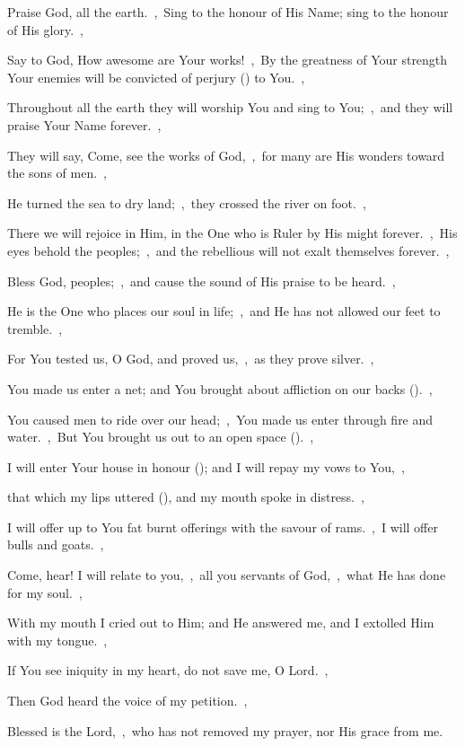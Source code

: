 \documentclass[12pt,twoside,a5paper]{article}
\begin{document}

\begin{normalparskip}
  Praise God, all the earth.~\sep\ Sing to the honour of His Name; sing to the honour of His glory.~\sep


  Say to God, How awesome are Your works!~\sep\ By the greatness of Your strength Your enemies will be convicted of perjury () to You.~\sep

  Throughout all the earth they will worship You and sing to You;~\sep\ and they will praise Your Name forever.~\sep

  They will say, Come, see the works of God,~\sep\ for many are His wonders toward the sons of men.~\sep

  He turned the sea to dry land;~\sep\ they crossed the river on foot.~\sep

  There we will rejoice in Him, in the One who is Ruler by His might forever.~\sep\ His eyes behold the peoples;~\sep\ and the rebellious will not exalt themselves forever.~\sep

  Bless God, peoples;~\sep\ and cause the sound of His praise to be heard.~\sep

  He is the One who places our soul in life;~\sep\ and He has not allowed our feet to tremble.~\sep

  For You tested us, O God, and proved us,~\sep\ as they prove silver.~\sep

  You made us enter a net; and You brought about affliction on our backs ().~\sep

  You caused men to ride over our head;~\sep\ You made us enter through fire and water.~\sep\ But You brought us out to an open space ().~\sep

  I will enter Your house in honour (); and I will repay my vows to You,~\sep

  that which my lips uttered (), and my mouth spoke in distress.~\sep

  I will offer up to You fat burnt offerings with the savour of rams.~\sep\ I will offer bulls and goats.~\sep

  Come, hear! I will relate to you,~\sep\ all you servants of God,~\sep\ what He has done for my soul.~\sep

  With my mouth I cried out to Him; and He answered me, and I extolled Him with my tongue.~\sep

  If You see iniquity in my heart, do not save me, O Lord.~\sep

  Then God heard the voice of my petition.~\sep

  Blessed is the Lord,~\sep\ who has not removed my prayer, nor His grace from me.
\end{normalparskip}
\end{document}
